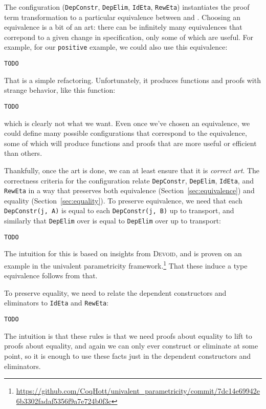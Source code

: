 The configuration (\lstinline{DepConstr}, \lstinline{DepElim}, \lstinline{IdEta}, \lstinline{RewEta}) instantiates
the proof term transformation to a particular equivalence between \A and \B.
Choosing an equivalence is a bit of an art: there can be infinitely many equivalences that correpond to a 
given change in specification, only some of which are useful.
For example, for our \lstinline{positive} example, we could also use this equivalence:

\begin{lstlisting}
TODO
\end{lstlisting}
That is a simple refactoring. Unfortunately, it produces functions and proofs with strange behavior, like this function:

\begin{lstlisting}
TODO
\end{lstlisting}
which is clearly not what we want.
Even once we've chosen an equivalence, we could define many possible configurations that correspond
to the equivalence, some of which will produce functions and proofs that are more useful or efficient than others.

Thankfully, once the art is done, we can at least ensure that it is \textit{correct art}.
The correctness criteria for the configuration relate \lstinline{DepConstr}, \lstinline{DepElim}, \lstinline{IdEta}, and \lstinline{RewEta}
in a way that preserves both equivalence (Section~\ref{sec:equivalence}) and equality (Section~\ref{sec:equality}).
To preserve equivalence, we need that each \lstinline{DepConstr(j, A)} is equal to each \lstinline{DepConstr(j, B)} up to transport,
and similarly that \lstinline{DepElim} over \A is equal to \lstinline{DepElim} over \B up to transport:

\begin{lstlisting}
TODO
\end{lstlisting}
The intuition for this is based on insights from \textsc{Devoid},
and is proven on an example in the univalent parametricity framework.\footnote{\url{https://github.com/CoqHott/univalent_parametricity/commit/7dc14e69942e6b3302fadaf5356f9a7e724b0f3c}}
That these induce a type equivalence follows from that.

To preserve equality, we need to relate the dependent constructors and eliminators to
\lstinline{IdEta} and \lstinline{RewEta}:

\begin{lstlisting}
TODO
\end{lstlisting}
The intuition is that these rules is that we need proofs about equality to lift to proofs about equality,
and again we can only ever construct or eliminate at some point, so it is enough
to use these facts just in the dependent constructors and eliminators.

